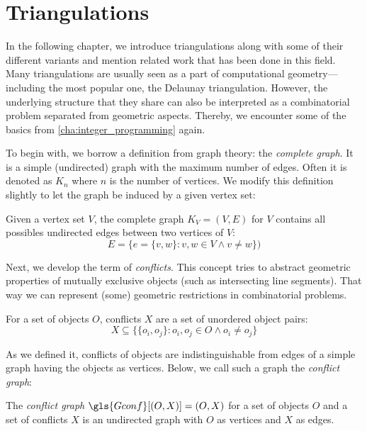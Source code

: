 \chapter{Triangulations}
\label{cha:triangulations}
In the following chapter, we introduce triangulations along with some
of their different variants and mention related work that has been done in
this field. Many triangulations are usually seen as a part of
computational geometry---including the most popular one, the Delaunay
triangulation. However, the underlying structure that they share can
also be interpreted as a combinatorial problem separated from
geometric aspects. Thereby, we encounter some of the basics from
\cref{cha:integer_programming} again.

To begin with, we borrow a definition from graph theory: the 
\emph{complete graph}. It is a simple (undirected) graph with the
maximum number of edges. Often it is denoted as \(K_n\) where \(n\) is
the number of vertices. We modify this definition slightly to let the
graph be induced by a given vertex set:

\begin{definition}
  Given a vertex set \(V\), the complete graph \(K_V=(V,E)\) for \(V\)
  contains all possibles undirected edges between two vertices of
  \(V\):
  \[ E = \{e=\{v,w\} : v,w \in V \land v\not=w\}) \]
\end{definition}

Next, we develop the term of \emph{conflicts}. This concept
tries to abstract geometric properties of mutually exclusive objects
(such as intersecting line segments). That way we can represent (some)
geometric restrictions in combinatorial problems.

\begin{definition}[Conflicts]
  \label{def:edge_conflicts}
  For a set of objects \(O\), conflicts \(X\) are a set of
  unordered object pairs:
  \[
    X \subseteq
    \{ \{ o_i, o_j \} : o_i, o_j \in O \land o_i \not= o_j \}
  \]
\end{definition}

As we defined it, conflicts of objects are indistinguishable from
edges of a simple graph having the objects as vertices. Below, we call
such a graph the \emph{conflict graph}:

\begin{definition}
  \label{def:conflict_graph}
  The \emph{conflict graph} \(\gls{Gconf}[(O,X)] = (O,X)\)
  for a set of objects \(O\) and a set of conflicts \(X\)
  is an undirected graph with \(O\) as vertices and \(X\) as edges.
\end{definition}

